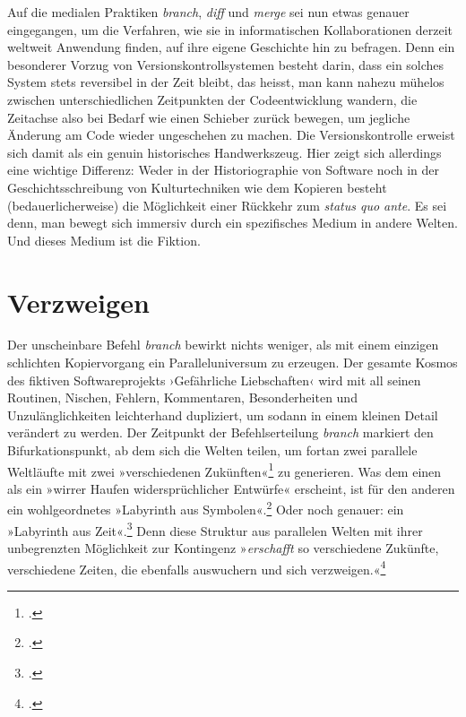 \documentclass[a4paper,10pt]{article}
\newcommand{\anf}[1]{»#1«}
\newcommand{\inanf}[1]{›#1‹}
\begin{document}
Auf die medialen Praktiken \emph{branch}, \emph{diff} und \emph{merge} sei nun etwas genauer eingegangen, um die Verfahren, wie sie in informatischen Kollaborationen derzeit weltweit Anwendung finden, auf ihre eigene Geschichte hin zu befragen. Denn ein besonderer Vorzug von Versionskontrollsystemen besteht darin, dass ein solches System stets reversibel in der Zeit bleibt, das heisst, man kann nahezu mühelos zwischen unterschiedlichen Zeitpunkten der Codeentwicklung wandern, die Zeitachse also bei Bedarf wie einen Schieber zurück bewegen, um jegliche Änderung am Code wieder ungeschehen zu machen. Die Versionskontrolle erweist sich damit als ein genuin historisches Handwerkszeug. Hier zeigt sich allerdings eine wichtige Differenz: Weder in der Historiographie von Software noch in der Geschichtsschreibung von Kulturtechniken wie dem Kopieren besteht (bedauerlicherweise) die Möglichkeit einer Rückkehr zum \emph{status quo ante}. Es sei denn, man bewegt sich immersiv durch ein spezifisches Medium in andere Welten. Und dieses Medium ist die Fiktion.

\enlargethispage{6mm}

\section{Verzweigen}

Der unscheinbare Befehl \emph{branch} bewirkt nichts weniger, als mit einem einzigen schlichten Kopiervorgang ein Paralleluniversum zu erzeugen. Der gesamte Kosmos des fiktiven Softwareprojekts \inanf{Gefährliche Liebschaften} wird mit all seinen Routinen, Nischen, Fehlern, Kommentaren, Besonderheiten und Unzulänglichkeiten leichterhand dupliziert, um sodann in einem kleinen Detail verändert zu werden. Der Zeitpunkt der Befehlserteilung \emph{branch} markiert den Bifurkationspunkt, ab dem sich die Welten teilen, um fortan zwei parallele Weltläufte mit zwei \anf{verschiedenen Zukünften}\footcite[169]{borges:1941} zu generieren. Was dem einen als ein \anf{wirrer Haufen widersprüchlicher Entwürfe} erscheint, ist für den anderen ein wohlgeordnetes \anf{Labyrinth aus Symbolen}.\footcite[168]{borges:1941} Oder noch genauer: ein \anf{Labyrinth aus Zeit}.\footcite[168]{borges:1941} Denn diese Struktur aus parallelen Welten mit ihrer unbegrenzten Möglichkeit zur Kontingenz \anf{\emph{erschafft} so verschiedene Zukünfte, verschiedene Zeiten, die ebenfalls auswuchern und sich verzweigen.}\footcite[170]{borges:1941} 
\end{document}

